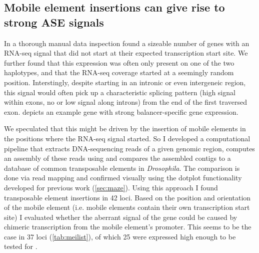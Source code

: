 \subsection{Mobile element insertions can give rise to strong ASE signals}
\label{sec:balancer_ase_mei}


In a thorough manual data inspection \yad found a sizeable number of genes with
an RNA-seq signal that did not start at their expected transcription start site.
We further found that this expression was often only present on one of the two
haplotypes, and that the RNA-seq coverage started at a seemingly random
position. Interstingly, despite starting in an intronic or even intergeneic
region, this signal would often pick up a characteristic splicing pattern
(high signal within exons, no or low signal along introns) from the end of the
first traversed exon.  depicts an example gene
with strong balancer-specific gene expression.

We speculated that this might be driven by the insertion of mobile elements in
the positions where the RNA-seq signal started. So I developed a computational
pipeline that extracts DNA-sequencing reads of a given genomic region,
computes an assembly of these reads using \spades and compares the assembled
contigs to a database of common transposable elements in \textit{Drosophila}.
The comparison is done via read mapping and confirmed visually using the dotplot
functionality developed for previous work (\cref{sec:maze}). Using this
approach I found transposable element insertions in 42 loci. Based on the
position and orientation of the mobile element (i.e. mobile elements contain
their own transcription start site) I evaluated whether the aberrant \ase
signal of the gene could be caused by chimeric transcription from the mobile
element’s promoter. This seems to be the case in 37 loci (\cref{tab:meilist}),
of which 25 were expressed high enough to be tested for \ase.

